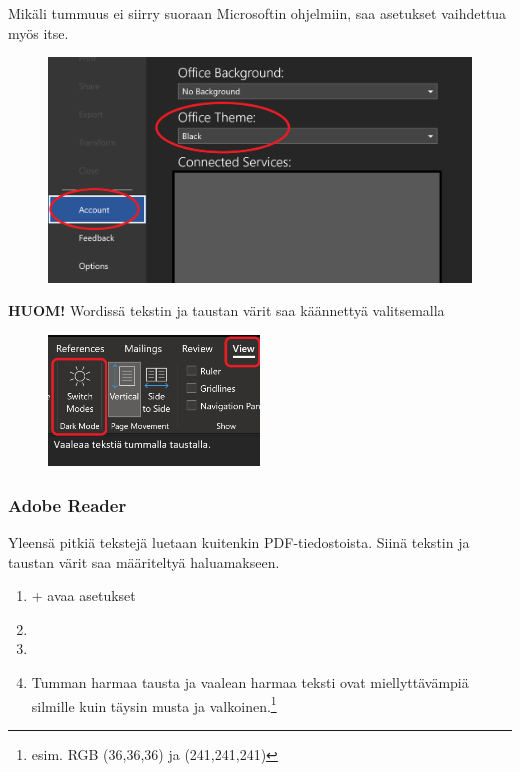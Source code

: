 \documentclass[a4paper,12pt]{scrartcl}
\begin{document}
Mikäli tummuus ei siirry suoraan Microsoftin ohjelmiin, saa asetukset vaihdettua myös itse.



\begin{figure}[H]
	\includegraphics[width=\textwidth]{Dark_theme_word}
\end{figure}

\textbf{HUOM!} Wordissä tekstin ja taustan värit saa käännettyä valitsemalla 



\begin{figure}[H]
	\includegraphics[width=0.5\textwidth]{dark_word}
\end{figure}

\subsubsection{Adobe Reader}

Yleensä pitkiä tekstejä luetaan kuitenkin PDF-tiedostoista. Siinä tekstin ja taustan värit saa määriteltyä haluamakseen.

\begin{enumerate}
	\item {}+ avaa asetukset 
	\item {}
	\item {}
	\item Tumman harmaa tausta ja vaalean harmaa teksti ovat miellyttävämpiä silmille kuin täysin musta ja valkoinen.\footnote{esim. RGB (36,36,36) ja (241,241,241)}
\end{enumerate}
\end{document}
